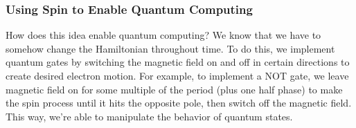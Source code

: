 \subsubsection{Using Spin to Enable Quantum Computing}

How does this idea enable quantum computing? We know that we have to somehow change the Hamiltonian throughout time. To do this, we implement quantum gates by switching the magnetic field on and off in certain directions to create desired electron motion. For example, to implement a NOT gate, we leave magnetic field on for some
multiple of the period (plus one half phase) to make the spin process until it hits the opposite pole, then switch off the magnetic field. This way, we're able to manipulate the behavior of quantum states.
